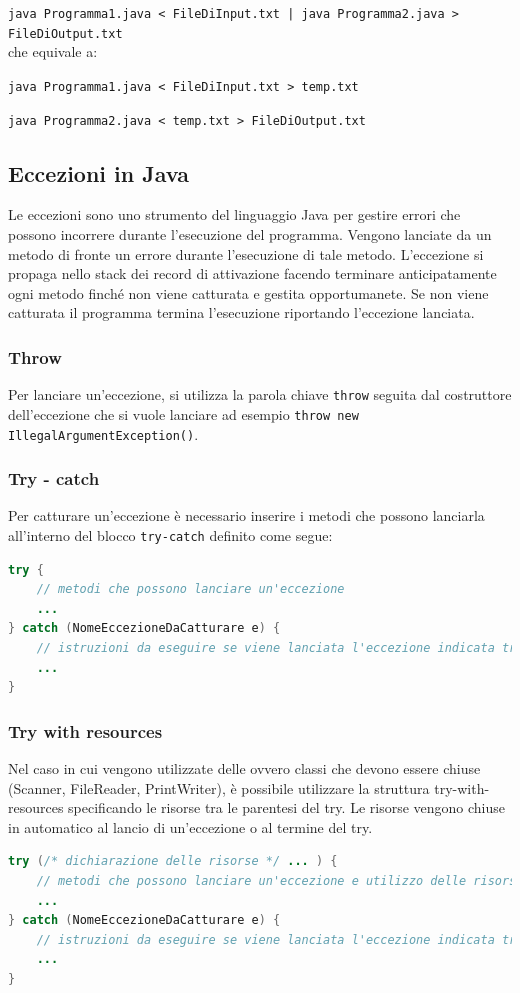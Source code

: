 \documentclass[a4paper]{article}
\begin{document}
\verb=java Programma1.java < FileDiInput.txt | java Programma2.java > FileDiOutput.txt=
\\
che equivale a:

\verb|java Programma1.java < FileDiInput.txt > temp.txt|

\verb|java Programma2.java < temp.txt > FileDiOutput.txt|

\newpage


\subsection{Eccezioni in Java}
Le eccezioni sono uno strumento del linguaggio Java per gestire errori che possono incorrere durante l'esecuzione del programma.
Vengono lanciate da un metodo di fronte un errore durante l'esecuzione di tale metodo. L'eccezione si propaga nello stack dei record
di attivazione facendo terminare anticipatamente ogni metodo finché non viene catturata e gestita opportumanete.
Se non viene catturata il programma termina l'esecuzione riportando l'eccezione lanciata.

\subsubsection*{Throw}
Per lanciare un'eccezione, si utilizza la parola chiave \verb|throw| seguita dal costruttore dell'eccezione che si vuole lanciare
ad esempio \verb|throw new IllegalArgumentException()|.

\subsubsection*{Try - catch}
Per catturare un'eccezione è necessario inserire i metodi che possono lanciarla all'interno del blocco \verb|try-catch|
definito come segue:
\begin{lstlisting}[language=Java]
try {
	// metodi che possono lanciare un'eccezione
	...
} catch (NomeEccezioneDaCatturare e) {
	// istruzioni da eseguire se viene lanciata l'eccezione indicata tra parentesi
	...
}
\end{lstlisting}

\subsubsection*{Try with resources}
Nel caso in cui vengono utilizzate delle  ovvero classi che devono essere chiuse (Scanner, FileReader, PrintWriter),
è possibile utilizzare la struttura try-with-resources specificando le risorse tra le parentesi del try. Le risorse vengono chiuse
in automatico al lancio di un'eccezione o al termine del try.
\begin{lstlisting}[language=Java]
try (/* dichiarazione delle risorse */ ... ) {
	// metodi che possono lanciare un'eccezione e utilizzo delle risorse
	...
} catch (NomeEccezioneDaCatturare e) {
	// istruzioni da eseguire se viene lanciata l'eccezione indicata tra parentesi
	...
}
\end{lstlisting}
\end{document}
